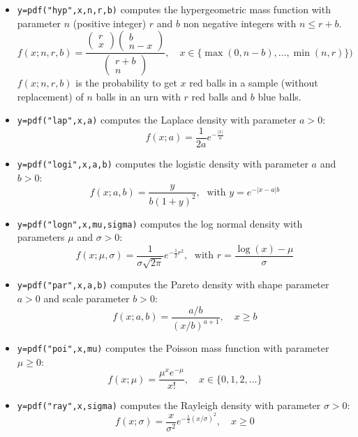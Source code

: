 \begin{mandescription}
\begin{itemize}
\item {} \verb!y=pdf("hyp",x,n,r,b)! computes
  the hypergeometric mass function with parameter $n$ (positive
  integer) $r$ and $b$ non negative integers with $n \le r + b$. 
$$
     f(x; n, r,b) = 
    \frac{\left(\begin{array}{c}r\\x\end{array}\right)
          \left(\begin{array}{c}b\\n-x\end{array}\right)}
         {\left(\begin{array}{c}r+b\\n\end{array}\right)},\quad x \in \{\max(0,n-b),\dots, \min(n,r)\})
$$
$f(x; n,r,b)$ is the probability to get $x$ red balls
in a sample (without replacement) of $n$ balls in an urn
with $r$ red balls and $b$ blue balls.


\item {} \verb!y=pdf("lap",x,a)! computes the Laplace
  density with parameter $a > 0$:
$$
     f(x; a) = \frac{1}{2a} e^{-\frac{|x|}{a}}
$$

\item {} \verb!y=pdf("logi",x,a,b)! computes the logistic
  density with parameter $a$ and $b > 0$:
$$
     f(x; a,b) = \frac{y}{b (1+y)^2}, \; \mbox{ with } y = e^{-{|x-a|}{b}}
$$


\item {} \verb!y=pdf("logn",x,mu,sigma)! computes
  the log normal density with parameters $\mu$ and $\sigma > 0$:
$$
     f(x; \mu, \sigma) = \frac{ 1 }{ \sigma \sqrt{2\pi}}
     e^{-\frac{1}{2} r^2 }, \; \mbox{ with } r = \frac{\log(x)-\mu}{\sigma}
$$


\item {} \verb!y=pdf("par",x,a,b)! computes the Pareto
  density with shape parameter $a > 0$ and scale parameter $b > 0$:
$$
     f(x; a, b) = \frac{ a/b }{ (x/b)^{a+1} }, \quad x \ge b
$$


\item {} \verb!y=pdf("poi",x,mu)! computes
  the Poisson mass function with parameter $\mu \ge 0$:
$$
     f(x; \mu) = \frac{\mu^x e^{-\mu}}{x!} , \quad x \in \{0, 1, 2, \dots\}
$$

\item {} \verb!y=pdf("ray",x,sigma)! computes the Rayleigh
  density with parameter $\sigma > 0$:
$$
     f(x; \sigma) = \frac{x}{\sigma^2} e^{-\frac{1}{2} (x/\sigma)^2 }, \quad x \ge 0
$$


\end{itemize}
\end{mandescription}
